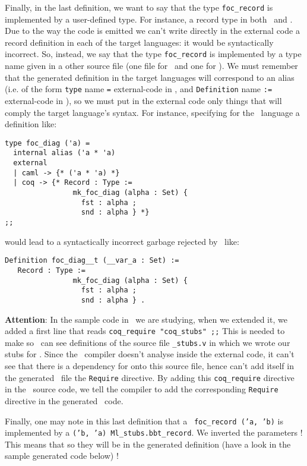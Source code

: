 Finally, in the last definition, we want to say that the type
{\tt foc\_record} is implemented by a user-defined type. For instance,
a record type in both \ocaml\ and \coq. Due to the way the code is
emitted we can't write directly in the external code a record
definition in each of the target languages: it would be syntactically
incorrect. So, instead, we say that the type {\tt foc\_record} is
implemented by a type name given in a other source file (one file for
\ocaml\ and one for \coq). We must remember that the generated
definition in the target languages will correspond to an alias
(i.e. of the form {\tt type} name {\tt =} external-code in \ocaml, and
{\tt Definition} name {\tt :=} external-code in \coq), so we must put
in the external code only things that will comply the target
language's syntax. For instance, specifying for the \coq\ language a
definition like:

{\footnotesize
\begin{lstlisting}
type foc_diag ('a) =
  internal alias ('a * 'a)
  external
  | caml -> {* ('a * 'a) *}
  | coq -> {* Record : Type :=
                mk_foc_diag (alpha : Set) {
                  fst : alpha ;
                  snd : alpha } *}
;;
\end{lstlisting}}

\noindent would lead to a syntactically incorrect garbage rejected by \coq\
like:

{\footnotesize
\begin{lstlisting}[language=MyCoq]
Definition foc_diag__t (__var_a : Set) :=
   Record : Type :=
                mk_foc_diag (alpha : Set) {
                  fst : alpha ;
                  snd : alpha } .
\end{lstlisting}}

\medskip
{\bf Attention}: In the sample code in \focalize\ we are studying,
when we extended it, we added a first line that reads
\lstinline!coq_require "coq_stubs" ;;! This is needed to make so \coq\
can see definitions of the source file  {\tt \coq\_stubs.v} in which we
wrote our stubs for \coq. Since the \focalize\ compiler doesn't
analyse inside the external code, it can't see that there is a
dependency for \coq onto this source file, hence can't add itself in
the generated \coq\ file the {\tt Require} directive. By adding this
{\tt coq\_require} directive in the \focalize\ source code, we tell
the compiler to add the corresponding {\tt Require} directive in the
generated \coq\ code.

\medskip
Finally, one may note in this last definition that a
\focalize\ {\tt foc\_record ('a, 'b)} is implemented by a
{\tt ('b, 'a) Ml\_stubs.bbt\_record}. We inverted the parameters !
This means that so they will be in the generated definition (have a
look in the sample generated code below) !

